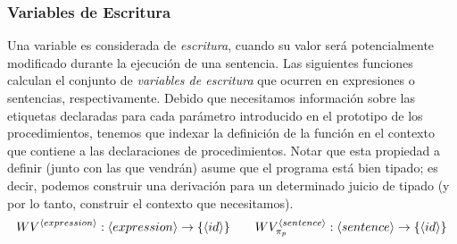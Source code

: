 \subsubsection{Variables de Escritura}

Una variable es considerada de \textit{escritura}, cuando su valor será potencialmente modificado durante la ejecución de una sentencia.
Las siguientes funciones calculan el conjunto de \textit{variables de escritura} que ocurren en expresiones o sentencias, respectivamente.
Debido que necesitamos información sobre las etiquetas declaradas para cada parámetro introducido en el prototipo de los procedimientos, tenemos que indexar la definición de la función en el contexto que contiene a las declaraciones de procedimientos.
Notar que esta propiedad a definir (junto con las que vendrán) asume que el programa está bien tipado; es decir, podemos construir una derivación para un determinado juicio de tipado (y por lo tanto, construir el contexto que necesitamos).
\begin{gather*}
WV^{\langle expression \rangle}: \langle expression \rangle \rightarrow \{ \langle id \rangle \}
\qquad
WV^{\langle sentence \rangle}_{\pi_{p}}: \langle sentence \rangle \rightarrow \{ \langle id \rangle \}
\end{gather*}

